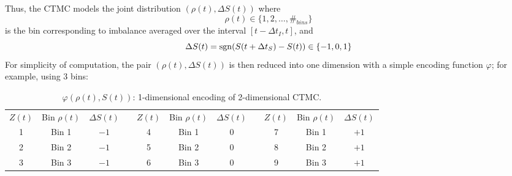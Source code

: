 Thus, the CTMC models the joint distribution $(\rho(t), \Delta S(t))$ where 
\[ \rho(t) \in \lbrace 1,2,\dots,\#_{bins} \rbrace \]
is the bin corresponding to imbalance averaged over the interval $[t-\Delta t_I, t]$, and
\[ \Delta S(t) = \operatorname{\mathrm{sgn}}(S(t+\Delta t_S)-S(t)) \in \lbrace -1, 0, 1 \rbrace \]
For simplicity of computation, the pair $(\rho(t), \Delta S(t))$ is then reduced into one dimension with a simple encoding function $\varphi$; for example, using 3 bins:
\begin{table}[H]
\centering
{}
\begin{tabular}{@{} *{11}{c} @{}}
\toprule
$Z(t)$ & Bin $\rho(t)$ & $\Delta S(t)$ & \phantom{abc} & $Z(t)$ & Bin $\rho(t)$ & $\Delta S(t)$ & \phantom{abc} & $Z(t)$ & Bin $\rho(t)$ & $\Delta S(t)$ \\
\cmidrule{1-3} \cmidrule{5-7} \cmidrule{9-11}
1 & Bin 1 & $-1$ && 4 & Bin 1 & $0$ && 7 & Bin 1 & $+1$ \\
2 & Bin 2 & $-1$ && 5 & Bin 2 & $0$ && 8 & Bin 2 & $+1$ \\
3 & Bin 3 & $-1$ && 6 & Bin 3 & $0$ && 9 & Bin 3 & $+1$ \\
\bottomrule
\end{tabular}
\caption[1-dimensional encoding of 2-dimensional CTMC]{$\varphi(\rho(t),S(t))$: 1-dimensional encoding of 2-dimensional CTMC.}
\end{table}

